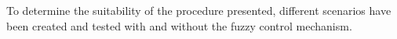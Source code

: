 To determine the suitability of the procedure presented, different scenarios have been created and tested with and without the fuzzy control mechanism. %
 
